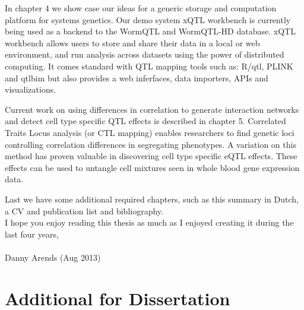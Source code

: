 \documentclass[8pt, twoside]{book}
\begin{document}
In chapter 4 we show case our ideas for a generic storage and computation platform for systems 
genetics. Our demo system xQTL workbench is currently being used as a backend to the 
WormQTL and WormQTL-HD database. xQTL workbench allows users to store and share their data in 
a local or web environment, and run analysis across datasets using the power of distributed 
computing. It comes standard with QTL mapping tools such as: R/qtl, PLINK and qtlbim but also
provides a web inferfaces, data importers, APIs and visualizations.

Current work on using differences in correlation to generate interaction networks and detect 
cell type specific QTL effects is described in chapter 5. Correlated Traits Locus analysis 
(or CTL mapping) enables researchers to find genetic loci controlling correlation differences 
in segregating phenotypes. A variation on this method has proven valuable in discovering cell 
type specific eQTL effects. These effects can be used to untangle cell mixtures seen in whole 
blood gene expression data.


Last we have some additional required chapters, such as this summary in Dutch, a CV and publication 
list and bibliography.\\

I hope you enjoy reading this thesis as much as I enjoyed creating it during the last four years,\\\\

Danny Arends (Aug 2013)
\newpage
\thispagestyle{empty}
















\chapter{Additional for Dissertation}
\end{document}
